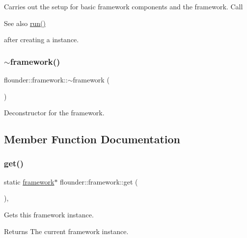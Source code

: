 Carries out the setup for basic framework components and the framework. Call \begin{DoxySeeAlso}{See also}
\hyperlink{classflounder_1_1framework_aa3a73c8e8f5f0c6ccef3e4de89982434}{run()}


\end{DoxySeeAlso}
after creating a instance. 

\mbox{\label{classflounder_1_1framework_a4f5440b66d1c2e7e35d9dc7fd733f944}} 
\subsubsection{\texorpdfstring{$\sim$framework()}{~framework()}}
{\footnotesize\ttfamily flounder\+::framework\+::$\sim$framework (\begin{DoxyParamCaption}{ }\end{DoxyParamCaption})}



Deconstructor for the framework. 



\subsection{Member Function Documentation}
\mbox{\label{classflounder_1_1framework_a1b1dbf1058cc4589b090326baf1beb87}} 
\subsubsection{\texorpdfstring{get()}{get()}}
{\footnotesize\ttfamily static \hyperlink{classflounder_1_1framework}{framework}$\ast$ flounder\+::framework\+::get (\begin{DoxyParamCaption}{ }\end{DoxyParamCaption})\hspace{0.3cm}{\ttfamily [inline]}, {\ttfamily [static]}}



Gets this framework instance. 

\begin{DoxyReturn}{Returns}
The current framework instance. 
\end{DoxyReturn}
\mbox{\label{classflounder_1_1framework_a180884fa93e39405354e4dcf329169d2}} 
